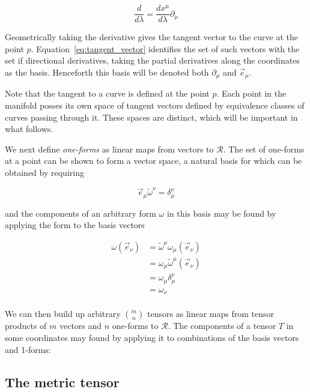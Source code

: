 \begin{equation}
\label{eq:tangent_vector}
\frac{d}{d\lambda} = \frac{dx^\mu}{d\lambda} \partial_\mu
\end{equation}

Geometrically taking the derivative gives the tangent vector to the
curve at the point $p$.  Equation~\ref{eq:tangent_vector} identifies
the set of such vectors with the set if directional derivatives,
taking the partial derivatives along the coordinates as the basis.
Henceforth this basis will be denoted both $\partial_\mu$ and
$\vec{e}_\mu$.

Note that the tangent to a curve is defined at the point $p$.  Each
point in the manifold posses its own space of tangent vectors defined
by equivalence classes of curves passing through it.  These spaces are 
distinct, which will be important in what follows.

We next define \emph{one-forms} as linear maps from vectors to
$\mathcal{R}$.  The set of one-forms at a point can be shown to form a
vector space, a natural basis for which can be obtained by requiring

\begin{equation*}
\vec{e}_\mu \tilde{\omega}^\nu = \delta_\mu^\nu
\end{equation*}

and the components of an arbitrary form $\omega$ in this basis may be
found by applying the form to the basis vectors

\begin{align*}
\omega(\vec{e}_\nu)
&= \tilde{\omega}^\mu \omega_\mu (\vec{e}_\nu) \\
&= \omega_\mu \tilde{\omega}^\mu (\vec{e}_\nu) \\
&= \omega_\mu \delta^\nu_\mu \\
&= \omega_\nu\\
\end{align*}

We can then build up arbitrary ${m \choose n}$ tensors as linear maps
from tensor products of $m$ vectors and $n$ one-forms to
$\mathcal{R}$.  The components of a tensor $T$ in some coordinates may
found by applying it to combinations of the basis vectors and 1-forms:


\subsection{The metric tensor}

